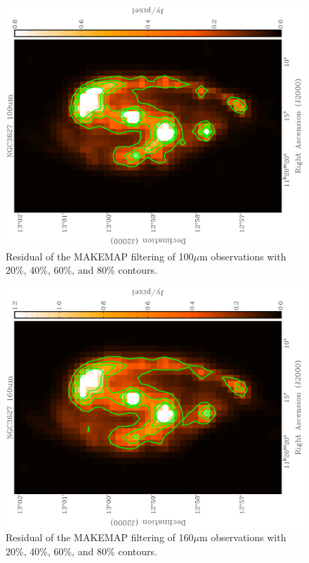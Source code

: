 \begin{figure}
  \centering
  \label{fig_100}
  \includegraphics[width=1.\textwidth,angle=270]{obs_imgs/100_um.eps}
  \caption[NGC3627 100$\mu$m Observations]{Residual of the MAKEMAP filtering of 100$\mu$m observations with 20\%, 40\%, 60\%, and 80\% contours.}
\end{figure}

\begin{figure}
  \centering
  \label{fig_160}
  \includegraphics[width=1.\textwidth,angle=270]{obs_imgs/160_um.eps}
  \caption[NGC3627 160$\mu$m Observations]{Residual of the MAKEMAP filtering of 160$\mu$m observations with 20\%, 40\%, 60\%, and 80\% contours.}
\end{figure}

